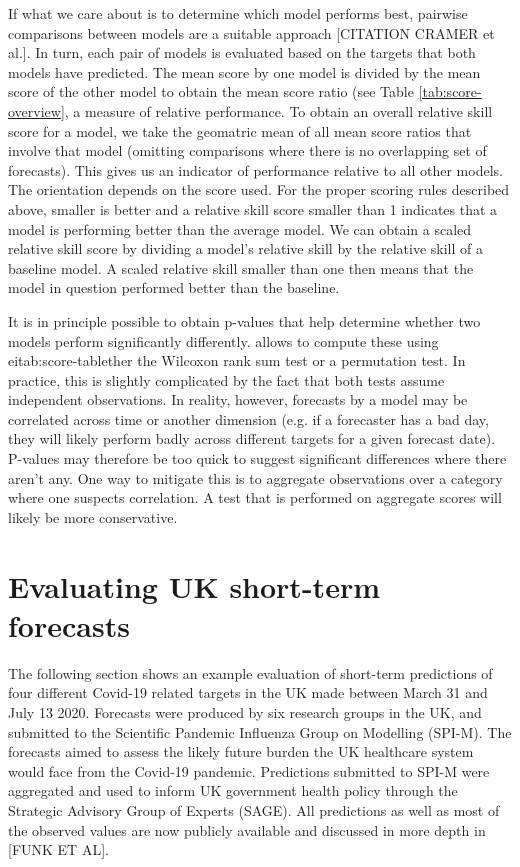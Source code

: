 \documentclass[article,shortnames]{jss}\usepackage[]{graphicx}\usepackage[]{color}
\begin{document}
If what we care about is to determine which model performs best, pairwise comparisons between models are a suitable approach [CITATION CRAMER et al.]. In turn, each pair of models is evaluated based on the targets that both models have predicted. The mean score by one model is divided by the mean score of the other model to obtain the mean score ratio (see Table \ref{tab:score-overview}, a measure of relative performance. To obtain an overall relative skill score for a model, we take the geomatric mean of all mean score ratios that involve that model  (omitting comparisons where there is no overlapping set of forecasts). This gives us an indicator of performance relative to all other models. The orientation depends on the score used. For the proper scoring rules described above, smaller is better and a relative skill score smaller than 1 indicates that a model is performing better than the average model. We can obtain a scaled relative skill score by dividing a model's relative skill by the relative skill of a baseline model. A scaled relative skill smaller than one then means that the model in question performed better than the baseline. 

It is in principle possible to obtain p-values that help determine whether two models perform significantly differently.  allows to compute these using eitab:score-tablether the Wilcoxon rank sum test or a permutation test. In practice, this is slightly complicated by the fact that both tests assume independent observations. In reality, however, forecasts by a model may be correlated across time or another dimension (e.g. if a forecaster has a bad day, they will likely perform badly across different targets for a given forecast date). P-values may therefore be too quick to suggest significant differences where there aren't any. One way to mitigate this is to aggregate observations over a category where one suspects correlation. A test that is performed on aggregate scores will likely be more conservative. 



\section{Evaluating UK short-term forecasts}

The following section shows an example evaluation of short-term predictions of four different Covid-19 related targets in the UK made between March 31 and July 13 2020. Forecasts were produced by six research groups in the UK, and submitted to the Scientific Pandemic Influenza Group on Modelling (SPI-M). The forecasts aimed to assess the likely future burden the UK healthcare system would face from the Covid-19 pandemic. Predictions submitted to SPI-M were aggregated and used to inform UK government health policy through the Strategic Advisory Group of Experts (SAGE). All predictions as well as most of the observed values are now publicly available and discussed in more depth in [FUNK ET AL]. 
\end{document}
